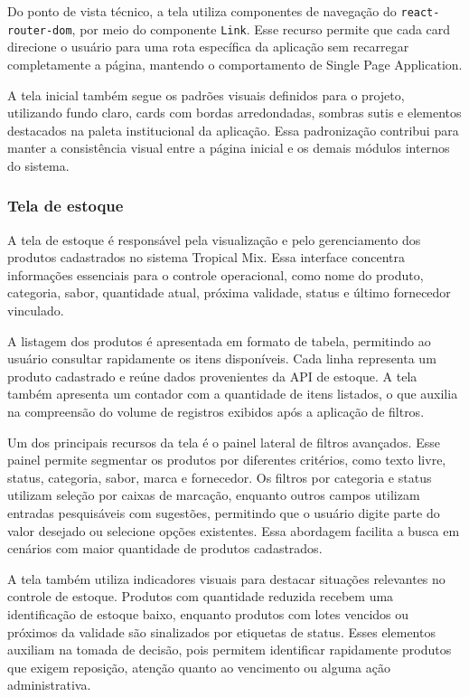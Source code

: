 Do ponto de vista técnico, a tela utiliza componentes de navegação do \texttt{react-router-dom}, por meio do componente \texttt{Link}. Esse recurso permite que cada card direcione o usuário para uma rota específica da aplicação sem recarregar completamente a página, mantendo o comportamento de Single Page Application.

A tela inicial também segue os padrões visuais definidos para o projeto, utilizando fundo claro, cards com bordas arredondadas, sombras sutis e elementos destacados na paleta institucional da aplicação. Essa padronização contribui para manter a consistência visual entre a página inicial e os demais módulos internos do sistema.

\subsubsection{Tela de estoque}

A tela de estoque é responsável pela visualização e pelo gerenciamento dos produtos cadastrados no sistema Tropical Mix. Essa interface concentra informações essenciais para o controle operacional, como nome do produto, categoria, sabor, quantidade atual, próxima validade, status e último fornecedor vinculado.

A listagem dos produtos é apresentada em formato de tabela, permitindo ao usuário consultar rapidamente os itens disponíveis. Cada linha representa um produto cadastrado e reúne dados provenientes da API de estoque. A tela também apresenta um contador com a quantidade de itens listados, o que auxilia na compreensão do volume de registros exibidos após a aplicação de filtros.

Um dos principais recursos da tela é o painel lateral de filtros avançados. Esse painel permite segmentar os produtos por diferentes critérios, como texto livre, status, categoria, sabor, marca e fornecedor. Os filtros por categoria e status utilizam seleção por caixas de marcação, enquanto outros campos utilizam entradas pesquisáveis com sugestões, permitindo que o usuário digite parte do valor desejado ou selecione opções existentes. Essa abordagem facilita a busca em cenários com maior quantidade de produtos cadastrados.

A tela também utiliza indicadores visuais para destacar situações relevantes no controle de estoque. Produtos com quantidade reduzida recebem uma identificação de estoque baixo, enquanto produtos com lotes vencidos ou próximos da validade são sinalizados por etiquetas de status. Esses elementos auxiliam na tomada de decisão, pois permitem identificar rapidamente produtos que exigem reposição, atenção quanto ao vencimento ou alguma ação administrativa.

